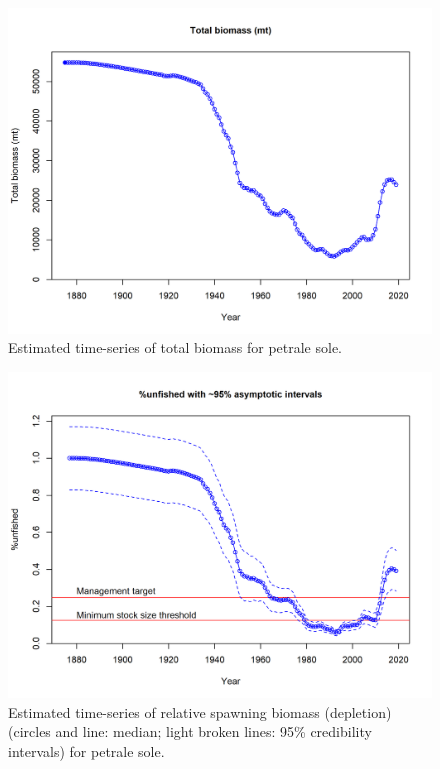 \documentclass[12pt,]{article}
\begin{document}
\FloatBarrier

\begin{figure}
\centering
\includegraphics{r4ss/plots_mod1/ts1_Total_biomass_(mt).png}
\caption{Estimated time-series of total biomass for petrale sole.
\label{fig:total_bio}}
\end{figure}

\FloatBarrier

\begin{figure}
\centering
\includegraphics{r4ss/plots_mod1/ts9_unfished_with_95_asymptotic_intervals_intervals.png}
\caption{Estimated time-series of relative spawning biomass (depletion)
(circles and line: median; light broken lines: 95\% credibility
intervals) for petrale sole. \label{fig:depl}}
\end{figure}
\end{document}
